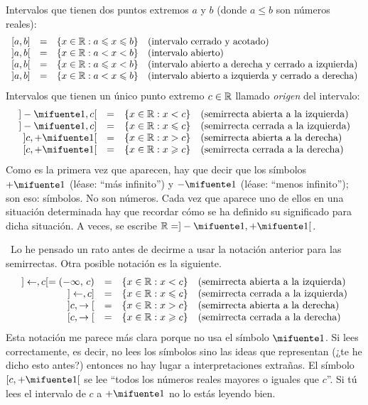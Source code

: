 \noindent Intervalos que tienen dos puntos extremos $a$ y $b$ (donde
$a\leq b$ son números reales): 
\[
\begin{array}{rcll}
\mbox{\ensuremath{[a,b]}} & = & \{x\in\mathbb R:a\leqslant x\leqslant b\} & \textrm{(intervalo cerrado y acotado)}\\
\mbox{\ensuremath{]a,b[}} & = & \{x\in\mathbb R:a<x<b\} & \textrm{(intervalo abierto)}\\
\mbox{\ensuremath{[a,b[}} & = & \{x\in\mathbb R:a\leqslant x<b\} & \textrm{(intervalo abierto a derecha y cerrado a izquierda)}\\
\mbox{\ensuremath{]a,b]}} & = & \{x\in\mathbb R:a<x\leqslant b\} & \textrm{(intervalo abierto a izquierda y cerrado a derecha)}
\end{array}
\]
Intervalos que tienen un único punto extremo $c\in\mathbb R$ llamado \emph{origen}
del intervalo: 
\[
\begin{array}{rcll}
\mbox{\ensuremath{]-\infinity,c[}} & = & \{x\in\R:x<c\} & \textrm{(semirrecta abierta a la izquierda)}\\
\mbox{\ensuremath{]-\infinity,c]}} & = & \{x\in\R:x\leqslant c\} & \textrm{(semirrecta cerrada a la izquierda)}\\
\mbox{\ensuremath{]c,+\infinity[}} & = & \{x\in\R:x>c\} & \textrm{(semirrecta abierta a la derecha)}\\
\mbox{\ensuremath{[c,+\infinity[}} & = & \{x\in\R:x\geqslant c\} & \textrm{(semirrecta cerrada a la derecha)}
\end{array}
\]
Como es la primera vez que aparecen, hay que decir que los símbolos
$+\infinity$ (léase: ``más infinito'') y $-\infinity$ (léase:
``menos infinito''); son eso: símbolos. No son números. Cada vez
que aparece uno de ellos en una situación determinada hay que recordar
cómo se ha definido su significado para dicha situación. A veces,
se escribe $\R=]-\infinity,+\infinity[$.

\ Lo
he pensado un rato antes de decirme a usar la notación anterior para
las semirrectas. Otra posible notación es la siguiente. 
\[
\begin{array}{rcll}
\mbox{\ensuremath{]\leftarrow,c[=\left(-\infty,\,c\right)}} & = & \{x\in\mathbb R:x<c\} & \textrm{(semirrecta abierta a la izquierda)}\\
\mbox{\ensuremath{]\leftarrow,c]}} & = & \{x\in\mathbb R:x\leqslant c\} & \textrm{(semirrecta cerrada a la izquierda)}\\
\mbox{\ensuremath{]c,\rightarrow[}} & = & \{x\in\mathbb R:x>c\} & \textrm{(semirrecta abierta a la derecha)}\\
\mbox{\ensuremath{[c,\rightarrow[}} & = & \{x\in\mathbb R:x\geqslant c\} & \textrm{(semirrecta cerrada a la derecha)}
\end{array}
\]
Esta notación me parece más clara porque no usa el símbolo $\infinity$.
Si lees correctamente, es decir, no lees los símbolos sino las ideas
que representan (¿te he dicho esto antes?) entonces no hay lugar a
interpretaciones extrañas. El símbolo $[c,+\infinity[$ se lee ``todos
los números reales mayores o iguales que $c$''. Si tú lees el intervalo
de $c$ a $+\infinity$ no lo estás leyendo bien.

